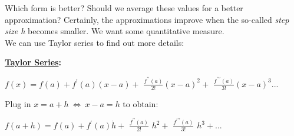 \documentclass[a4paper,12pt]{report}
\begin{document}
\begin{multicols}{2}
\begin{center}
\end{center}
\end{multicols}



	Which form is better?  Should we average these values for a better approximation?  Certainly, the approximations improve when the
	so-called \textit{step size h} becomes smaller.  We want some quantitative measure.\\
	
	\noindent We can use Taylor series to find out more details:
	
\begin{center}
	\fbox
	{
		\parbox{0.7\textwidth}
		{
			\textbf{\underline{Taylor Series}:}
			\begin{center}
				$f(x) = f(a) + f^\prime(a)(x-a) +$ \large $\frac{f^{\prime \prime}(a)}{2!}$\normalsize$(x-a)^2 +$
				\large $\frac{f^{\prime \prime \prime}(a)}{3!}$\normalsize $(x-a)^3 ...$
			\end{center}
		}
	}
\end{center}
	\medskip
	\noindent Plug in $x =  a+ h \: \Leftrightarrow \: x - a = h$ to obtain:

\begin{center}
	$f(a+h) = f(a) + f^\prime(a) \dot h + $ \large $\frac{f^{\prime \prime}(a)}{2!}$ \normalsize $\! \!h^2 +$ \large
	$\frac{f^{\prime \prime \prime}(a)}{3!}$ \normalsize $\!\! h^3 +...$ 
\end{center}
	\bigskip
\end{document}
